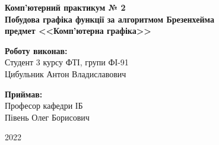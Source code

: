 \begin{titlepage}
    \begin{center}
        \begin{spacing}{1.5}
            \textbf{\Large{Комп'ютерний практикум № 2}} \\
            \vspace{1cm}\textbf{\Large{Побудова графіка функції \linebreak 
            за алгоритмом Брезенхейма}} \\
            \vspace{1cm}\textbf{\large{предмет <<Комп'ютерна графіка>>}}
        \end{spacing}
    \end{center}

    \vspace{13em}

    \newlength{\maxname}

    \hfill\parbox{\maxname}{
        \begin{spacing}{1.1}
            \small{\textbf{Роботу виконав:}} \\ 
            \small{Студент 3 курсу ФТІ, групи ФІ-91} \\
            \small{Цибульник Антон Владиславович} \\
        \end{spacing}
    }

    \hfill\parbox{\maxname}{
        \begin{spacing}{1.1}
            \small{\textbf{Приймав:}} \\ 
            \small{Професор кафедри ІБ} \\
            \small{Півень Олег Борисович} \\
        \end{spacing}
    }

    \vspace{\fill}
    
    \begin{center}
        \small{2022}
    \end{center}
    
\end{titlepage}